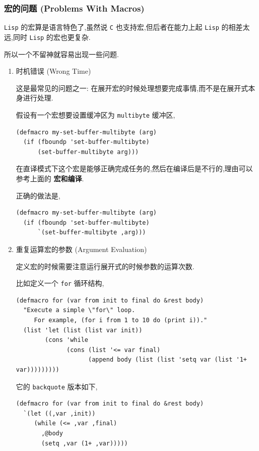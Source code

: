 \documentclass[11pt]{article}
\begin{document}
\subsubsection{宏的问题 (Problems With Macros)}
\label{sec:org1856407}

\texttt{Lisp} 的宏算是语言特色了,虽然说 \texttt{C} 也支持宏,但后者在能力上起 \texttt{Lisp} 的相差太远,同时 \texttt{Lisp} 的宏也更复杂.

所以一个不留神就容易出现一些问题.

\begin{enumerate}
\item 时机错误 (Wrong Time)
\label{sec:org4f5cb25}

这是最常见的问题之一: 在展开宏的时候处理想要完成事情,而不是在展开式本身进行处理.

假设有一个宏想要设置缓冲区为 \texttt{multibyte} 缓冲区,

\begin{verbatim}
(defmacro my-set-buffer-multibyte (arg)
  (if (fboundp 'set-buffer-multibyte)
      (set-buffer-multibyte arg)))
\end{verbatim}

在直译模式下这个宏是能够正确完成任务的,然后在编译后是不行的,理由可以参考上面的 \textbf{宏和编译}.

正确的做法是,

\begin{verbatim}
(defmacro my-set-buffer-multibyte (arg)
  (if (fboundp 'set-buffer-multibyte)
      `(set-buffer-multibyte ,arg)))
\end{verbatim}


\item 重复运算宏的参数 (Argument Evaluation)
\label{sec:orgd5f4437}

定义宏的时候需要注意运行展开式的时候参数的运算次数.

比如定义一个 \texttt{for} 循环结构,

\begin{verbatim}
(defmacro for (var from init to final do &rest body)
  "Execute a simple \"for\" loop.
     For example, (for i from 1 to 10 do (print i))."
  (list 'let (list (list var init))
        (cons 'while
              (cons (list '<= var final)
                    (append body (list (list 'setq var (list '1+ var)))))))))
\end{verbatim}

它的 \texttt{backquote} 版本如下,

\begin{verbatim}
(defmacro for (var from init to final do &rest body)
  `(let ((,var ,init))
     (while (<= ,var ,final)
       ,@body
       (setq ,var (1+ ,var)))))
\end{verbatim}


\end{enumerate}
\end{document}
